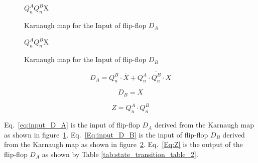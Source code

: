 


\begin{figure}[ht!]
    \centering
    \begin{Karnaughvuit}{$Q^A_n Q^B_n$}{X}
    \end{Karnaughvuit}
    \caption{Karnaugh map for the Input of flip-flop $D_A$}\label{fig:input_D_A}
\end{figure}\FloatBarrier



\begin{figure}[ht!]
\centering
\begin{Karnaughvuit}{$Q^A_n Q^B_n$}{X}
\end{Karnaughvuit}
\caption{Karnaugh map for the Input of flip-flop $D_B$}\label{fig:input_D_B}
\end{figure}\FloatBarrier

\begin{equation}\label{eq:input_D_A}
    D_A = {Q^B_n} \cdot \overline{X} + Q^A_n \cdot \overline{Q^B_n} \cdot X
\end{equation}

\begin{equation}\label{Eq:input_D_B}
    D_B = X
\end{equation}

\begin{equation}\label{Eq:Z}
    Z = Q^A_n \cdot Q^B_n
\end{equation}

Eq.~\ref{eq:input_D_A} is the input of flip-flop $D_A$ derived from the Karnaugh map as shown in figure~\ref{fig:input_D_A}. 
Eq.~\ref{Eq:input_D_B} is the input of flip-flop $D_B$ derived from the Karnaugh map as shown in figure~\ref{fig:input_D_B}.
Eq.~\ref{Eq:Z} is the output of the flip-flop $D_A$ as shown by Table \ref{tab:state_transition_table_2}.
    




